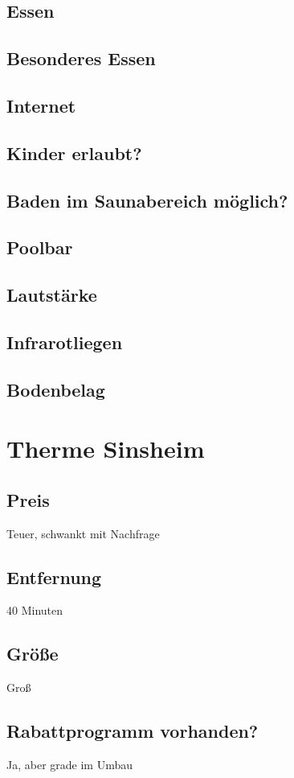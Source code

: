 \documentclass{article}
\begin{document}
\subsection*{Essen}
\subsection*{Besonderes Essen}
\subsection*{Internet}
\subsection*{Kinder erlaubt?}
\subsection*{Baden im Saunabereich möglich?}
\subsection*{Poolbar}
\subsection*{Lautstärke}
\subsection*{Infrarotliegen}
\subsection*{Bodenbelag}
\pagebreak

\section*{Therme Sinsheim}
\subsection*{Preis} Teuer, schwankt mit Nachfrage
\subsection*{Entfernung} 40 Minuten
\subsection*{Größe} Groß
\subsection*{Rabattprogramm vorhanden?} Ja, aber grade im Umbau 
\end{document}
